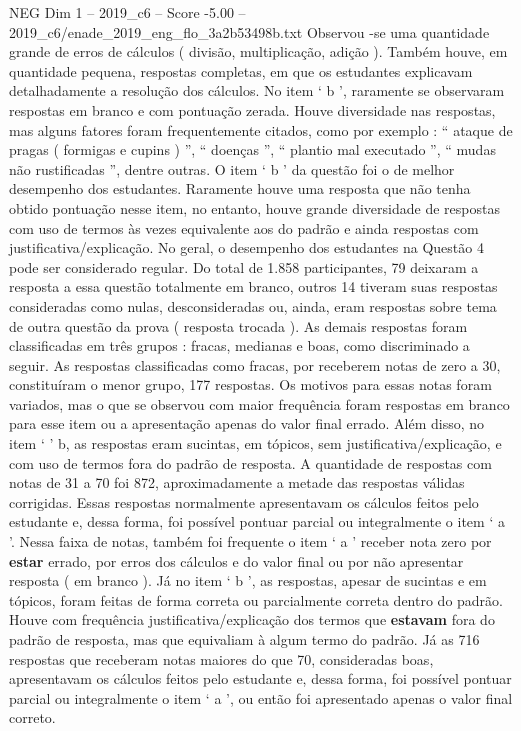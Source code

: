 \begin{textsample}{NEG Dim 1 – 2019\_c6 – Score -5.00 – 2019\_c6/enade\_2019\_eng\_flo\_3a2b53498b.txt}
Observou -se uma quantidade grande de erros de cálculos ( divisão, multiplicação, adição ).
Também houve, em quantidade pequena, respostas completas, em que os estudantes explicavam detalhadamente a resolução dos cálculos.
No item ‘ b ’, raramente se observaram respostas em branco e com pontuação zerada.
Houve diversidade nas respostas, mas alguns fatores foram frequentemente citados, como por exemplo : “ ataque de pragas ( formigas e cupins ) ”, “ doenças ”, “ plantio mal executado ”, “ mudas não rustificadas ”, dentre outras.
O item ‘ b ’ da questão foi o de melhor desempenho dos estudantes.
Raramente houve uma resposta que não tenha obtido pontuação nesse item, no entanto, houve grande diversidade de respostas com uso de termos às vezes equivalente aos do padrão e ainda respostas com justificativa/explicação.
No geral, o desempenho dos estudantes na Questão 4 pode ser considerado regular.
Do total de 1.858 participantes, 79 deixaram a resposta a essa questão totalmente em branco, outros 14 tiveram suas respostas consideradas como nulas, desconsideradas ou, ainda, eram respostas sobre tema de outra questão da prova ( resposta trocada ).
As demais respostas foram classificadas em três grupos : fracas, medianas e boas, como discriminado a seguir.
As respostas classificadas como fracas, por receberem notas de zero a 30, constituíram o menor grupo, 177 respostas.
Os motivos para essas notas foram variados, mas o que se observou com maior frequência foram respostas em branco para esse item ou a apresentação apenas do valor final errado.
Além disso, no item ‘ ’ b, as respostas eram sucintas, em tópicos, sem justificativa/explicação, e com uso de termos fora do padrão de resposta.
A quantidade de respostas com notas de 31 a 70 foi 872, aproximadamente a metade das respostas válidas corrigidas.
Essas respostas normalmente apresentavam os cálculos feitos pelo estudante e, dessa forma, foi possível pontuar parcial ou integralmente o item ‘ a ’.
Nessa faixa de notas, também foi frequente o item ‘ a ’ receber nota zero por \textbf{estar} errado, por erros dos cálculos e do valor final ou por não apresentar resposta ( em branco ).
Já no item ‘ b ’, as respostas, apesar de sucintas e em tópicos, foram feitas de forma correta ou parcialmente correta dentro do padrão.
Houve com frequência justificativa/explicação dos termos que \textbf{estavam} fora do padrão de resposta, mas que equivaliam à algum termo do padrão.
Já as 716 respostas que receberam notas maiores do que 70, consideradas boas, apresentavam os cálculos feitos pelo estudante e, dessa forma, foi possível pontuar parcial ou integralmente o item ‘ a ’, ou então foi apresentado apenas o valor final correto.

\end{textsample}
